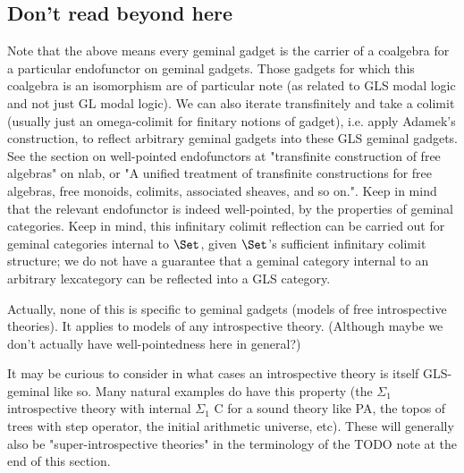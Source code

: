 \subsection{Don't read beyond here}

\begin{TODOblock}
Note that the above means every geminal gadget is the carrier of a coalgebra for a particular endofunctor on geminal gadgets. Those gadgets for which this coalgebra is an isomorphism are of particular note (as related to GLS modal logic and not just GL modal logic). We can also iterate transfinitely and take a colimit (usually just an omega-colimit for finitary notions of gadget), i.e. apply Adamek's construction, to reflect arbitrary geminal gadgets into these GLS geminal gadgets. See the section on well-pointed endofunctors at "transfinite construction of free algebras" on nlab, or "A unified treatment of transfinite constructions for free algebras, free monoids, colimits, associated sheaves, and so on.". Keep in mind that the relevant endofunctor is indeed well-pointed, by the properties of geminal categories. Keep in mind, this infinitary colimit reflection can be carried out for geminal categories internal to $\Set$, given $\Set$'s sufficient infinitary colimit structure; we do not have a guarantee that a geminal category internal to an arbitrary lexcategory can be reflected into a GLS category.

Actually, none of this is specific to geminal gadgets (models of free introspective theories). It applies to models of any introspective theory. (Although maybe we don't actually have well-pointedness here in general?)

It may be curious to consider in what cases an introspective theory is itself GLS-geminal like so. Many natural examples do have this property (the $\Sigma_1$ introspective theory with internal $\Sigma_1$ C for a sound theory like PA, the topos of trees with step operator, the initial arithmetic universe, etc). These will generally also be "super-introspective theories" in the terminology of the TODO note at the end of this section.
\end{TODOblock}

